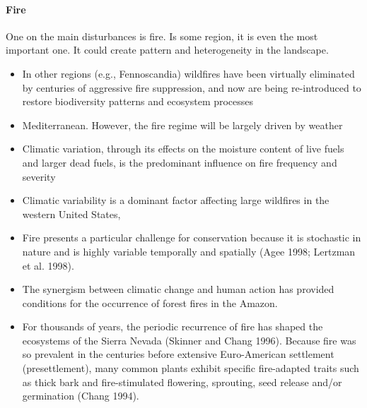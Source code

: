 \documentclass{article}
\begin{document}
\paragraph{Fire \\}

One on the main disturbances is fire. Is some region, it is even the most important one. It could create pattern and heterogeneity in the landscape.



\begin{itemize}
   \item In other regions (e.g., Fennoscandia) wildfires have been virtually eliminated by centuries of aggressive fire suppression, and now are being re-introduced to restore biodiversity patterns and ecosystem processes \cite{wallenius2011major}
   \item Mediterranean. However, the fire regime will be largely driven by weather \cite{fernandes_fire-smart_2013}
   \item Climatic variation, through its effects on the moisture content of live fuels and larger dead fuels, is the predominant influence on fire frequency and severity \cite{schoennagel_interaction_2004}
   \item Climatic variability is a dominant factor affecting large wildfires in the western United States,\cite{mckenzie_climatic_2004}
   \item Fire presents a particular challenge for conservation because it is stochastic in nature and is highly variable temporally and spatially (Agee 1998; Lertzman et al. 1998). \cite{agee1998landscape} \cite{lertzman1998three}
    \item The synergism between climatic change and human action has provided conditions for the occurrence of forest fires in the Amazon. \cite{da2018dynamics}
    \item For thousands of years, the periodic recurrence of fire has shaped the ecosystems of the Sierra Nevada (Skinner and Chang 1996). Because fire was so prevalent in the centuries before extensive Euro-American settlement (presettlement), many common plants exhibit specific fire-adapted traits such as thick bark and fire-stimulated flowering, sprouting, seed release and/or germination (Chang 1994). \cite{mckelvey1996overview} \cite{chang1996ecosystem}
\end{itemize}
\end{document}
